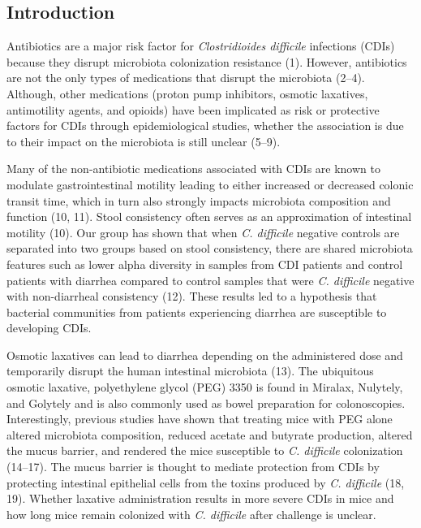 \documentclass[
  11pt,
]{article}
\begin{document}
\newpage

\hypertarget{introduction}{%
\subsection{Introduction}\label{introduction}}

Antibiotics are a major risk factor for \emph{Clostridioides difficile}
infections (CDIs) because they disrupt microbiota colonization
resistance (1). However, antibiotics are not the only types of
medications that disrupt the microbiota (2--4). Although, other
medications (proton pump inhibitors, osmotic laxatives, antimotility
agents, and opioids) have been implicated as risk or protective factors
for CDIs through epidemiological studies, whether the association is due
to their impact on the microbiota is still unclear (5--9).

Many of the non-antibiotic medications associated with CDIs are known to
modulate gastrointestinal motility leading to either increased or
decreased colonic transit time, which in turn also strongly impacts
microbiota composition and function (10, 11). Stool consistency often
serves as an approximation of intestinal motility (10). Our group has
shown that when \emph{C. difficile} negative controls are separated into
two groups based on stool consistency, there are shared microbiota
features such as lower alpha diversity in samples from CDI patients and
control patients with diarrhea compared to control samples that were
\emph{C. difficile} negative with non-diarrheal consistency (12). These
results led to a hypothesis that bacterial communities from patients
experiencing diarrhea are susceptible to developing CDIs.

Osmotic laxatives can lead to diarrhea depending on the administered
dose and temporarily disrupt the human intestinal microbiota (13). The
ubiquitous osmotic laxative, polyethylene glycol (PEG) 3350 is found in
Miralax, Nulytely, and Golytely and is also commonly used as bowel
preparation for colonoscopies. Interestingly, previous studies have
shown that treating mice with PEG alone altered microbiota composition,
reduced acetate and butyrate production, altered the mucus barrier, and
rendered the mice susceptible to \emph{C. difficile} colonization
(14--17). The mucus barrier is thought to mediate protection from CDIs
by protecting intestinal epithelial cells from the toxins produced by
\emph{C. difficile} (18, 19). Whether laxative administration results in
more severe CDIs in mice and how long mice remain colonized with
\emph{C. difficile} after challenge is unclear.
\end{document}
